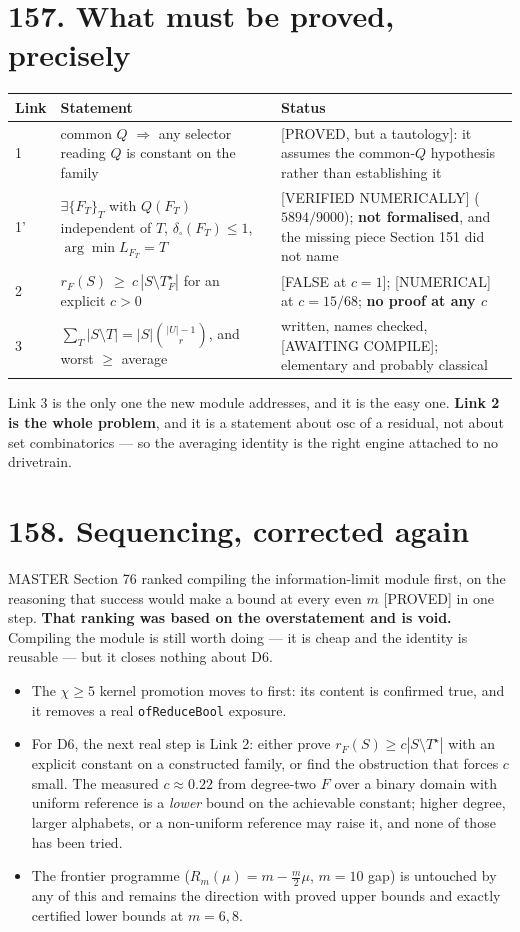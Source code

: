 \documentclass[9pt,twocolumn]{article}
\newcommand{\eclass}[1]{\textsf{[#1]}}
\renewcommand{\_}{\CIGunderscore\allowbreak}
\begin{document}
\section*{157. What must be proved, precisely}
\begin{center}\scriptsize
\begin{tabularx}{0.98\columnwidth}{l X X}
\toprule
Link & Statement & Status\\
\midrule
1 & common $Q$ $\Rightarrow$ any selector reading $Q$ is constant on the family & \eclass{PROVED, but a tautology}: it assumes the common-$Q$ hypothesis rather than establishing it\\
1' & $\exists\{F_T\}_{T}$ with $Q(F_T)$ independent of $T$, $\delta_\square(F_T)\le1$, $\arg\min L_{F_T}=T$ & \eclass{VERIFIED NUMERICALLY} ($5894/9000$); \textbf{not formalised}, and the missing piece Section 151 did not name\\
2 & $r_F(S)\ \ge\ c\,|S\setminus T^\star_F|$ for an explicit $c>0$ & \eclass{FALSE at $c=1$}; \eclass{NUMERICAL} at $c=15/68$; \textbf{no proof at any $c$}\\
3 & $\sum_{T}|S\setminus T|=|S|\binom{|U|-1}{r}$, and worst $\ge$ average & written, names checked, \eclass{AWAITING COMPILE}; elementary and probably classical\\
\bottomrule
\end{tabularx}
\end{center}
Link 3 is the only one the new module addresses, and it is the easy one. \textbf{Link 2 is the whole problem}, and it is a statement about $\mathrm{osc}$ of a residual, not about set combinatorics --- so the averaging identity is the right engine attached to no drivetrain.

\section*{158. Sequencing, corrected again}
MASTER Section 76 ranked compiling the information-limit module first, on the reasoning that success would make a bound at every even $m$ \eclass{PROVED} in one step. \textbf{That ranking was based on the overstatement and is void.} Compiling the module is still worth doing --- it is cheap and the identity is reusable --- but it closes nothing about D6.
\begin{itemize}
\item The $\chi\ge5$ kernel promotion moves to first: its content is confirmed true, and it removes a real \texttt{ofReduceBool} exposure.
\item For D6, the next real step is Link 2: either prove $r_F(S)\ge c|S\setminus T^\star|$ with an explicit constant on a constructed family, or find the obstruction that forces $c$ small. The measured $c\approx0.22$ from degree-two $F$ over a binary domain with uniform reference is a \emph{lower} bound on the achievable constant; higher degree, larger alphabets, or a non-uniform reference may raise it, and none of those has been tried.
\item The frontier programme ($R_m(\mu)=m-\tfrac m2\mu$, $m{=}10$ gap) is untouched by any of this and remains the direction with proved upper bounds and exactly certified lower bounds at $m=6,8$.
\end{itemize}
\end{document}
